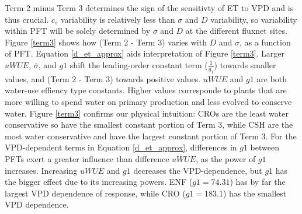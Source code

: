 \documentclass[draft,linenumbers]{agujournal}
\begin{document}
Term 2 minus Term 3 determines the sign of the sensitivty of ET to VPD and is thus crucial. $c_s$ variability is relatively less than $\sigma$ and $D$ variability, so variability within PFT will be solely determined by $\sigma$ and $D$ at the different fluxnet sites. Figure \ref{term3} shows how (Term 2 - Term 3) varies with $D$ and $\sigma$, as a function of PFT. Equation \ref{d_et_approx} aids interpretation of Figure \ref{term3}. Larger $uWUE$, $\overline{\sigma}$, and $g1$ shift the leading-order constant term ($\frac{1}{g_1}$) towards smaller values, and (Term 2 - Term 3) towards positive values. $uWUE$ and $g1$ are both water-use effiency type constants. Higher values corresponde to plants that are more willing to spend water on primary production and less evolved to conserve water. Figure \ref{term3} confirms our physical intuition: CROs are the least water conservative so have the smallest constant portion of Term 3, while CSH are the most water conservative and have the largest constant portion of Term 3. For the VPD-dependent terms in Equation \ref{d_et_approx}, differences in $g1$ between PFTs exert a greater influence than difference $uWUE$, as the power of $g1$ increases. Increasing $uWUE$ and $g1$ decreases the VPD-dependence, but $g1$ has the bigger effect due to its increasing powers. ENF ($g1 = 74.31$) has by far the largest VPD dependence of response, while CRO ($g1 = 183.1$) has the smallest VPD dependence.  
\end{document}
